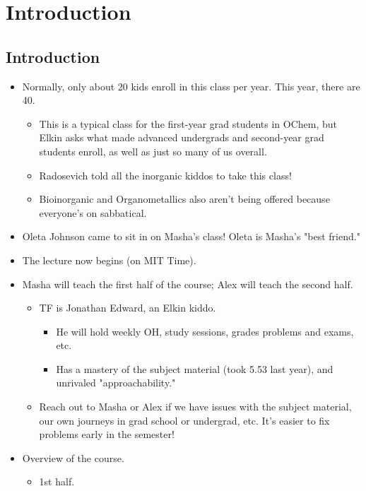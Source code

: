 \documentclass[../notes.tex]{subfiles}
\begin{document}
\chapter{Introduction}
\section{Introduction}
\begin{itemize}
    \item {}Normally, only about 20 kids enroll in this class per year. This year, there are 40.
    \begin{itemize}
        \item This is a typical class for the first-year grad students in OChem, but Elkin asks what made advanced undergrads and second-year grad students enroll, as well as just so many of us overall.
        \item Radosevich told all the inorganic kiddos to take this class!
        \item Bioinorganic and Organometallics also aren't being offered because everyone's on sabbatical.
    \end{itemize}
    \item Oleta Johnson came to sit in on Masha's class! Oleta is Masha's "best friend."
    \item The lecture now begins (on MIT Time).
    \item Masha will teach the first half of the course; Alex will teach the second half.
    \begin{itemize}
        \item TF is Jonathan Edward, an Elkin kiddo.
        \begin{itemize}
            \item He will hold weekly OH, study sessions, grades problems and exams, etc.
            \item Has a mastery of the subject material (took 5.53 last year), and unrivaled "approachability."
        \end{itemize}
        \item Reach out to Masha or Alex if we have issues with the subject material, our own journeys in grad school or undergrad, etc. It's easier to fix problems early in the semester!
    \end{itemize}
    \item Overview of the course.
    \begin{itemize}
        \item 1st half.
        \begin{itemize}

\end{itemize}
\end{itemize}
\end{itemize}
\end{document}
